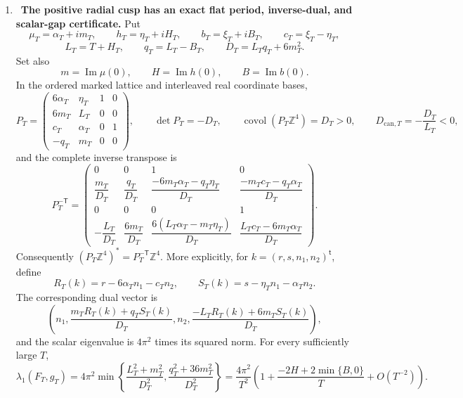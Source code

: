 \begin{enumerate}[leftmargin=1.8em,itemsep=.65em]
$[i_b^*Q]_{\bar\partial}=[Q_F]_{\bar\partial}$ does not require
$i_b^*Q=Q_F$ as forms.  The chosen $Q$ cannot be real, although its fibre
class is real.  After fixing the distinguished $\mathfrak g$ and one
coherent-Leray lift $\mathfrak q$, changing the smooth representatives and
horizontal corrections changes $G,Q$ by Dolbeault coboundaries and changes
none of the displayed classes, pairings, or products.  This is a
candidate-specific rank-one line-bundle normalization, not a statement
about arbitrary gauge theories.
\item \Verified\ \textbf{The positive radial cusp has an exact flat
period, inverse-dual, and scalar-gap certificate.}
Put
\[
 \mu_T=\alpha_T+i m_T,\qquad h_T=\eta_T+i H_T,\qquad
 b_T=\xi_T+i B_T,\qquad c_T=\xi_T-\eta_T,
\]
\[
 L_T=T+H_T,\qquad q_T=L_T-B_T,\qquad
 D_T=L_Tq_T+6m_T^2.
\]
Set also
\[
 m=\operatorname{Im}\mu(0),\qquad
 H=\operatorname{Im}h(0),\qquad
 B=\operatorname{Im}b(0).
\]
In the ordered marked lattice and interleaved real coordinate bases,
\[
 P_T=
 \begin{pmatrix}
  6\alpha_T&\eta_T&1&0\\
  6m_T&L_T&0&0\\
  c_T&\alpha_T&0&1\\
  -q_T&m_T&0&0
 \end{pmatrix},\qquad
 \det P_T=-D_T,\qquad
 \operatorname{covol}(P_T\mathbb Z^4)=D_T>0,\qquad
 D_{\mathrm{can},T}=-\frac{D_T}{L_T}<0,
\]
and the complete inverse transpose is
\[
 P_T^{-\mathsf T}=
 \begin{pmatrix}
 0&0&1&0\\[2pt]
 \dfrac{m_T}{D_T}&\dfrac{q_T}{D_T}&
 \dfrac{-6m_T\alpha_T-q_T\eta_T}{D_T}&
 \dfrac{-m_Tc_T-q_T\alpha_T}{D_T}\\[7pt]
 0&0&0&1\\[2pt]
 -\dfrac{L_T}{D_T}&\dfrac{6m_T}{D_T}&
 \dfrac{6(L_T\alpha_T-m_T\eta_T)}{D_T}&
 \dfrac{L_Tc_T-6m_T\alpha_T}{D_T}
 \end{pmatrix}.
\]
Consequently
\((P_T\mathbb Z^4)^*=P_T^{-\mathsf T}\mathbb Z^4\).  More explicitly,
for \(k=(r,s,n_1,n_2)^{\mathsf t}\), define
\[
 R_T(k)=r-6\alpha_Tn_1-c_Tn_2,\qquad
 S_T(k)=s-\eta_Tn_1-\alpha_Tn_2.
\]
The corresponding dual vector is
\[
 \left(n_1,
 \frac{m_TR_T(k)+q_TS_T(k)}{D_T},n_2,
 \frac{-L_TR_T(k)+6m_TS_T(k)}{D_T}\right),
\]
and the scalar eigenvalue is \(4\pi^2\) times its squared norm.
For every sufficiently large \(T\),
\[
 \lambda_1(F_T,g_T)
 =4\pi^2\min\left\{
 \frac{L_T^2+m_T^2}{D_T^2},
 \frac{q_T^2+36m_T^2}{D_T^2}\right\}
 =\frac{4\pi^2}{T^2}\left(
 1+\frac{-2H+2\min\{B,0\}}T+O(T^{-2})\right).
\]
\end{enumerate}
